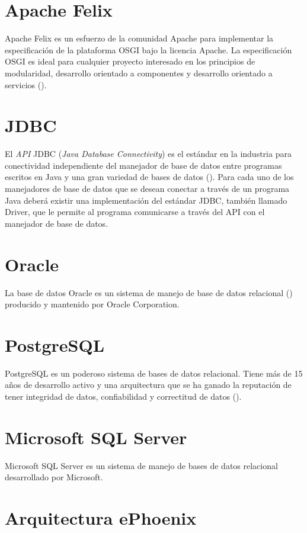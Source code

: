 \section{Apache Felix}

Apache Felix es un esfuerzo de la comunidad Apache para implementar la especificación de
la plataforma OSGI bajo la licencia Apache. La especificación OSGI es ideal para
cualquier proyecto interesado en los principios de modularidad, desarrollo orientado
a componentes y desarrollo orientado a servicios (\cite{FELIX}).

\section{JDBC}

El \emph{API} JDBC (\emph{Java Database Connectivity}) es el estándar en la industria
para conectividad independiente del manejador de base de datos entre programas escritos en
Java y una gran variedad de bases de datos (\cite{JDBC}). Para cada uno de los manejadores
de base de datos que se desean conectar a través de un programa Java deberá existir una implementación
del estándar JDBC, también llamado Driver, que le permite al programa comunicarse a través del
API con el manejador de base de datos.

\section{Oracle}

La base de datos Oracle es un sistema de manejo de base de datos relacional (\cite{ORACLE})
producido y mantenido por Oracle Corporation.

\section{PostgreSQL}

PostgreSQL es un poderoso sistema de bases de datos relacional. Tiene más de
15 años de desarrollo activo y una arquitectura que se ha ganado la reputación de tener
integridad de datos, confiabilidad y correctitud de datos (\cite{POSTGRE}).

\section{Microsoft SQL Server}
Microsoft SQL Server es un sistema de manejo de bases de datos relacional desarrollado por
Microsoft.

\section{Arquitectura ePhoenix}

